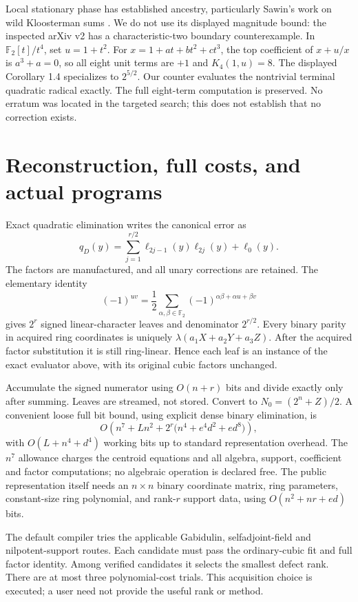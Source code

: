 \documentclass[11pt]{article}
\theoremstyle{remark}\newtheorem{remark}[theorem]{Remark}
\newcommand{\F}{\mathbb F}\newcommand{\Tr}{\operatorname{Tr}}
\begin{document}
Local stationary phase has established ancestry, particularly Sawin's
work on wild Kloosterman sums \cite{sawin}. We do not use its displayed
magnitude bound: the inspected arXiv v2 has a characteristic-two boundary
counterexample. In $\F_2[t]/t^4$, set $u=1+t^2$.
For $x=1+at+bt^2+ct^3$, the top coefficient of $x+u/x$ is
$a^3+a=0$, so all eight unit terms are $+1$ and $K_4(1,u)=8$.
The displayed Corollary 1.4 specializes to $2^{5/2}$.
Our counter evaluates the nontrivial terminal quadratic radical exactly.
The full eight-term computation is preserved. No erratum was located in
the targeted search; this does not establish that no correction exists.

\section{Reconstruction, full costs, and actual programs}
Exact quadratic elimination writes the canonical error as
\[
 q_D(y)=\sum_{j=1}^{r/2}\ell_{2j-1}(y)\ell_{2j}(y)+\ell_0(y).
\]
The factors are manufactured, and all unary corrections are retained.
The elementary identity
\[
 (-1)^{uv}=\frac12\sum_{\alpha,\beta\in\F_2}
     (-1)^{\alpha\beta+\alpha u+\beta v}
\]
gives $2^r$ signed linear-character leaves and denominator $2^{r/2}$.
Every binary parity in acquired ring coordinates is uniquely
$\lambda(a_1X+a_2Y+a_3Z)$. After the acquired factor substitution it is
still ring-linear. Hence each leaf is an instance of the exact evaluator
above, with its original cubic factors unchanged.

Accumulate the signed numerator using $O(n+r)$ bits and divide exactly
only after summing. Leaves are streamed, not stored. Convert to
$N_0=(2^n+Z)/2$. A convenient loose full bit bound, using explicit dense
binary elimination, is
\begin{equation}\label{eq:cost}
 O\!\left(n^7+Ln^2+
    2^r\bigl(n^4+e^4d^2+ed^8\bigr)\right),
\end{equation}
with $O(L+n^4+d^4)$ working bits up to standard representation overhead.
The $n^7$ allowance charges the centroid equations and all algebra,
support, coefficient and factor computations; no algebraic operation is
declared free. The public representation itself needs an $n\times n$ binary
coordinate matrix, ring parameters, constant-size ring polynomial,
and rank-$r$ support data, using $O(n^2+nr+ed)$ bits.

The default compiler tries the applicable Gabidulin, selfadjoint-field and
nilpotent-support routes. Each candidate must pass the ordinary-cubic fit
and full factor identity. Among verified candidates it selects the smallest
defect rank. There are at most three polynomial-cost trials. This acquisition
choice is executed; a user need not provide the useful rank or method.
\end{document}
